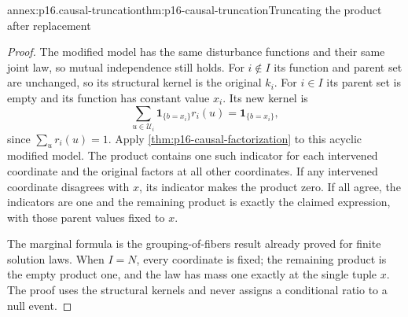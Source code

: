 \begin{annexitem}{annex:p16.causal-truncation}{thm:p16-causal-truncation}{Truncating the product after replacement}
\begin{proof}
The modified model has the same disturbance functions and their same
joint law, so mutual independence still holds. For \(i\notin I\)
its function and parent set are unchanged, so its structural kernel is
the original \(k_i\). For \(i\in I\) its parent set is empty
and its function has constant value \(x_i\). Its new kernel is
\[
 \sum_{u\in\mathcal U_i}\mathbf1_{\{b=x_i\}}r_i(u)
       =\mathbf1_{\{b=x_i\}},
\]
since \(\sum_u r_i(u)=1\). Apply
\cref{thm:p16-causal-factorization} to this acyclic modified model.
The product contains one such indicator for each intervened coordinate
and the original factors at all other coordinates. If any intervened
coordinate disagrees with \(x\), its indicator makes the product zero.
If all agree, the indicators are one and the remaining product is exactly
the claimed expression, with those parent values fixed to \(x\).

The marginal formula is the grouping-of-fibers result already proved for
finite solution laws. When \(I=N\), every coordinate is fixed; the
remaining product is the empty product one, and the law has mass one
exactly at the single tuple \(x\). The proof uses the structural
kernels and never assigns a conditional ratio to a null event.
\end{proof}
\end{annexitem}

